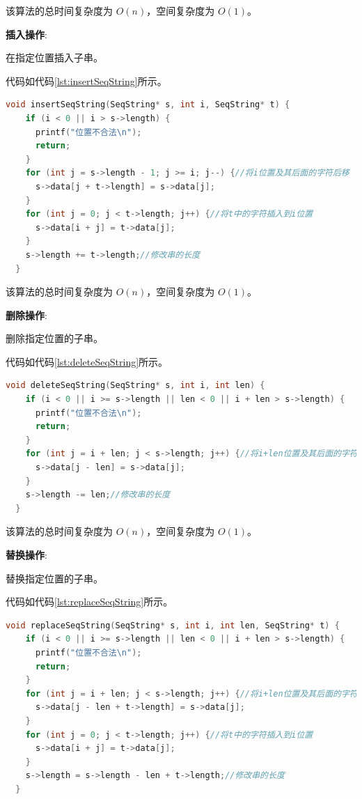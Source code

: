 \documentclass[lang=cn,newtx,10pt,scheme=chinese]{../elegantbook}
\begin{document}
该算法的总时间复杂度为 $O(n)$，空间复杂度为 $O(1)$。


\textbf{插入操作}:

在指定位置插入子串。

代码如代码\ref{lst:insertSeqString}所示。

\begin{lstlisting}[language=C++, caption={在指定位置插入子串示例代码}, label={lst:insertSeqString}]
  void insertSeqString(SeqString* s, int i, SeqString* t) {
    if (i < 0 || i > s->length) {
      printf("位置不合法\n");
      return;
    }
    for (int j = s->length - 1; j >= i; j--) {//将i位置及其后面的字符后移
      s->data[j + t->length] = s->data[j];
    }
    for (int j = 0; j < t->length; j++) {//将t中的字符插入到i位置
      s->data[i + j] = t->data[j];
    }
    s->length += t->length;//修改串的长度
  }

\end{lstlisting}

该算法的总时间复杂度为 $O(n)$，空间复杂度为 $O(1)$。


\textbf{删除操作}:

删除指定位置的子串。

代码如代码\ref{lst:deleteSeqString}所示。

\begin{lstlisting}[language=C++, caption={删除指定位置的子串示例代码}, label={lst:deleteSeqString}]
  void deleteSeqString(SeqString* s, int i, int len) {
    if (i < 0 || i >= s->length || len < 0 || i + len > s->length) {
      printf("位置不合法\n");
      return;
    }
    for (int j = i + len; j < s->length; j++) {//将i+len位置及其后面的字符前移
      s->data[j - len] = s->data[j];
    }
    s->length -= len;//修改串的长度
  }

\end{lstlisting}

该算法的总时间复杂度为 $O(n)$，空间复杂度为 $O(1)$。


\textbf{替换操作}:

替换指定位置的子串。

代码如代码\ref{lst:replaceSeqString}所示。

\begin{lstlisting}[language=C++, caption={替换指定位置的子串示例代码}, label={lst:replaceSeqString}]
  void replaceSeqString(SeqString* s, int i, int len, SeqString* t) {
    if (i < 0 || i >= s->length || len < 0 || i + len > s->length) {
      printf("位置不合法\n");
      return;
    }
    for (int j = i + len; j < s->length; j++) {//将i+len位置及其后面的字符前移
      s->data[j - len + t->length] = s->data[j];
    }
    for (int j = 0; j < t->length; j++) {//将t中的字符插入到i位置
      s->data[i + j] = t->data[j];
    }
    s->length = s->length - len + t->length;//修改串的长度
  }

\end{lstlisting}
\end{document}
